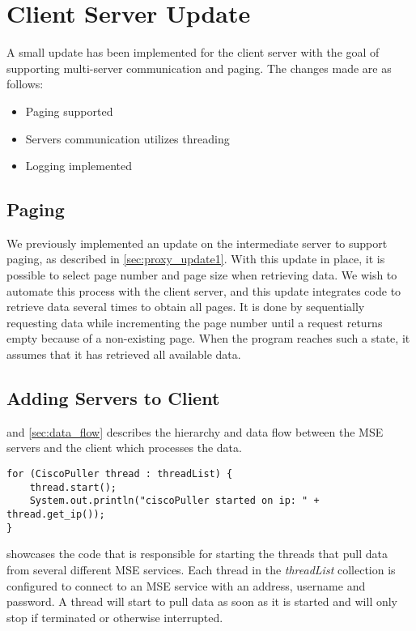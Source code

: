 \section{Client Server Update}
A small update has been implemented for the client server with the goal of supporting multi-server communication and paging. The changes made are as follows:

\begin{itemize}
\item Paging supported
\item Servers communication utilizes threading
\item Logging implemented
\end{itemize}

\subsection{Paging}
We previously implemented an update on the intermediate server to support paging, as described in \cref{sec:proxy_update1}. With this update in place, it is possible to select page number and page size when retrieving data. We wish to automate this process with the client server, and this update integrates code to retrieve data several times to obtain all pages. It is done by sequentially requesting data while incrementing the page number until a request returns empty because of a non-existing page. When the program reaches such a state, it assumes that it has retrieved all available data.

\subsection{Adding Servers to Client}
 and \cref{sec:data_flow} describes the hierarchy and data flow between the MSE servers and the client which processes the data. 
\begin{lstlisting}[caption={Starting threads to pull data from multiple MSE servers}, label={lst:cisco_puller}, language=inc_Java]
for (CiscoPuller thread : threadList) {
    thread.start();
    System.out.println("ciscoPuller started on ip: " + thread.get_ip());
}
\end{lstlisting}
 showcases the code that is responsible for starting the threads that pull data from several different MSE services. Each thread in the \textit{threadList} collection is configured to connect to an MSE service with an address, username and password. A thread will start to pull data as soon as it is started and will only stop if terminated or otherwise interrupted.

